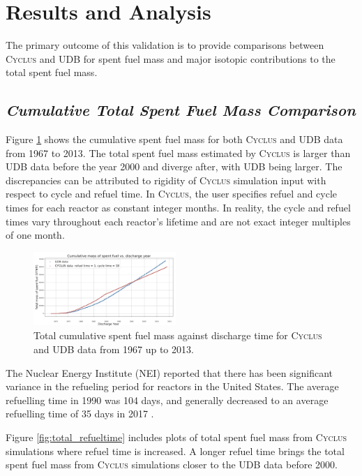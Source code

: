 \documentclass{anstrans}
\newcommand{\Cyclus}{\textsc{Cyclus}\xspace}%
\begin{document}
\section{Results and Analysis}
The primary outcome of this validation is to provide comparisons between \Cyclus and UDB for spent fuel mass and major isotopic contributions to the total spent fuel mass. 

\subsection{\textit{Cumulative Total Spent Fuel Mass Comparison}}
Figure \ref{fig:total_original} shows the cumulative spent fuel mass for both \Cyclus and UDB data from 1967 to 2013. The total spent fuel mass estimated by \Cyclus is larger than UDB data before the year 2000 and diverge after, with UDB being larger. The discrepancies can be attributed to rigidity of \Cyclus simulation input with respect to cycle and refuel time. In \Cyclus, the user specifies refuel and cycle times for each reactor as constant integer months. In reality, the cycle and refuel times vary throughout each reactor's lifetime and are not exact integer multiples of one month. 

\begin{figure}[h] %
	\centering
	\includegraphics[width=0.48\textwidth]{total_cumulative_mass_spent_fuel_original}
	\caption{Total cumulative spent fuel mass against discharge time for \Cyclus and UDB data from 1967 up to 2013.}
	\label{fig:total_original}
\end{figure}

The Nuclear Energy Institute (NEI) reported that there has been significant variance in the refueling period for reactors in the United States. The average refuelling time in 1990 was 104 days, and generally decreased to an average refuelling time of 35 days in 2017 \cite{iaea_current_nodate}.

Figure \ref{fig:total_refueltime} includes plots of total spent fuel mass from \Cyclus simulations where refuel time is increased. A longer refuel time brings the total spent fuel mass from \Cyclus simulations closer to the UDB data before 2000. 
\end{document}
